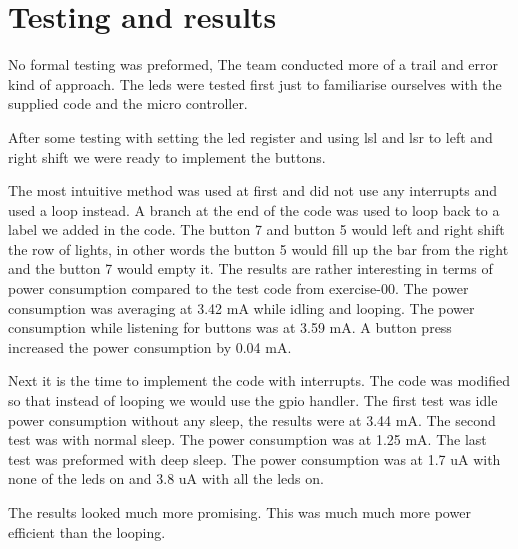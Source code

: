 \section{Testing and results}
No formal testing was preformed, The team conducted more of a trail and error kind of approach.
The leds were tested first just to familiarise ourselves with the supplied code and the micro controller.

After some testing with setting the led register and using lsl and lsr to left and right shift we were ready to implement the buttons.

The most intuitive method was used at first and did not use any interrupts and used a loop instead.
A branch at the end of the code was used to loop back to a label we added in the code.
The button 7 and button 5 would left and right shift the row of lights, in other words the button 5 would fill up the bar from the right and the button 7 would empty it.
The results are rather interesting in terms of power consumption compared to the test code from exercise-00.
The power consumption was averaging at 3.42 mA while idling and looping. 
The power consumption while listening for buttons was at 3.59 mA.
A button press increased the power consumption by 0.04 mA.

Next it is the time to implement the code with interrupts.
The code was modified so that instead of looping we would use the gpio handler.
The first test was idle power consumption without any sleep, the results were at 3.44 mA.
The second test was with normal sleep.
The power consumption was at 1.25 mA.
The last test was preformed with deep sleep.
The power consumption was at 1.7 uA with none of the leds on and 3.8 uA with all the leds on.

The results looked much more promising.
This was much much more power efficient than the looping.
